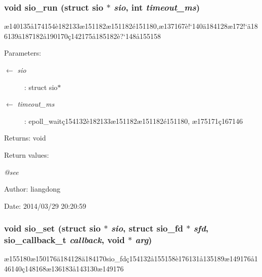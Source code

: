 \subsubsection{\setlength{\rightskip}{0pt plus 5cm}void sio\_\-run (struct sio $\ast$ {\em sio}, int {\em timeout\_\-ms})}\label{sio_8c_a12}


\ae{}140135\aa{}174154\`{e}182133\ae{}151182\ae{}151182\'{e}151180,\ae{}137167\`{e}!`140\"{a}184128\ae{}172!`\"{a}186139\"{a}187182\aa{}190170\c{c}142175\aa{}185182\`{e}?`148\aa{}155158 

\begin{Desc}
\item[Parameters:]
\begin{description}
\item[\mbox{$\leftarrow$} {\em sio}]: struct sio$\ast$ \item[\mbox{$\leftarrow$} {\em timeout\_\-ms}]: epoll\_\-wait\c{c}154132\`{e}182133\ae{}151182\ae{}151182\'{e}151180, \ae{}175171\c{c}167146 \end{description}
\end{Desc}
\begin{Desc}
\item[Returns:]void \end{Desc}
\begin{Desc}
\item[Return values:]
\begin{description}
\item[{\em @see}]\end{description}
\end{Desc}
\begin{Desc}
\item[Author:]liangdong \end{Desc}
\begin{Desc}
\item[Date:]2014/03/29 20:20:59 \end{Desc}
\subsubsection{\setlength{\rightskip}{0pt plus 5cm}void sio\_\-set (struct sio $\ast$ {\em sio}, struct sio\_\-fd $\ast$ {\em sfd}, sio\_\-callback\_\-t {\em callback}, void $\ast$ {\em arg})}\label{sio_8c_a4}


\ae{}155180\ae{}150176\"{a}184128\"{a}184170sio\_\-fd\c{c}154132\aa{}155158\`{e}176131\aa{}135189\ae{}149176\aa{}146140\c{c}148168\ae{}136183\aa{}143130\ae{}149176 

